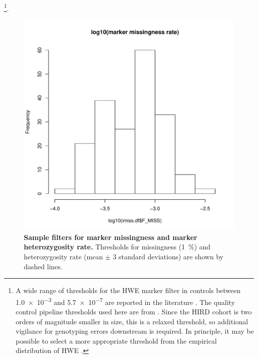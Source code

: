 \begin{itemize}
        \footnote{
            A wide range of thresholds for the \gls{HWE} marker filter in controls between \num{1.0e-3} and \num{5.7e-7} are reported in the literature \autocite{anderson2010DataQualityControl}.
            The quality control pipeline thresholds used here are from \textcite{delange2017GenomewideAssociationStudy}. 
            Since the \gls{HIRD} cohort is two orders of magnitude smaller in size, this is a relaxed threshold, so additional vigilance for genotyping errors downstream is required.
            In principle, it may be possible to select a more appropriate threshold from the empirical distribution of \gls{HWE} \pvalues{} \autocite{mccarthy2008GenomewideAssociationStudies}.
        }.
\end{itemize}

\begin{figure}
    \includegraphics[width=1.0\textwidth,page=2]{mainmatter/figures/chapter_02/coreex_eQTLflu_20171204.gencall.smajor.impute_sex.qc2.pdf}
    \caption{
        \textbf{Sample filters for marker missingness and marker heterozygosity rate.}
        Thresholds for missingness (\SI{1}{\percent}) and heterozygosity rate (mean $\pm$ 3 standard deviations) are shown by dashed lines.
    }
    \label{fig:hird_genotype_sample_hetRate_missingness}
\end{figure}

